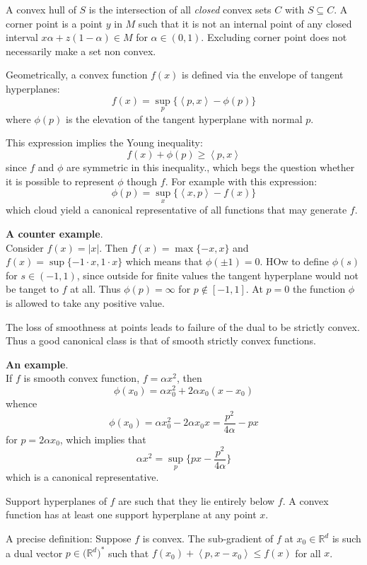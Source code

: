 \documentclass[a4paper]{article}
\newcommand{\brkt}[1]{{\left\langle #1 \right\rangle}}
\newcommand{\Real}{\mathbb{R}}
\begin{document}
A convex hull of $S$ is the intersection of all \emph{closed} convex sets $C$ with $S\subseteq C$. A corner point is a point $y$ in $M$ such that it is not an internal point of any closed interval $x\alpha + z(1-\alpha)\in M$ for $\alpha\in(0,1)$. Excluding corner point does not necessarily make a set non convex.

Geometrically, a convex function $f(x)$ is defined via the envelope of tangent hyperplanes:
\[f(x) = \sup_p \big\{ \brkt{p,x} - \phi(p) \big\}\]
where $\phi(p)$ is the elevation of the tangent hyperplane with normal $p$.

This expression implies the Young inequality:
\[f(x) + \phi(p) \geq \brkt{p,x}\]
since $f$ and $\phi$ are symmetric in this inequality., which begs the question whether it is possible to represent $\phi$ though $f$.
For example with this expression:
\[\phi(p) = \sup_x \big\{\brkt{x,p}-f(x)\big\}\]
which cloud yield a canonical representative of all functions that may generate $f$.

\textbf{A counter example}.\hfill \\
Consider $f(x) = \lvert x \rvert$. Then $f(x) = \max\{-x,x\}$ and $f(x) = \sup\{-1\cdot x, 1\cdot x\}$
which means that $\phi(\pm1)=0$. HOw to define $\phi(s)$ for $s\in (-1,1)$, since outside for finite values the tangent hyperplane would not be tanget to $f$ at all. Thus $\phi(p)=\infty$ for $p\notin [-1,1]$. At $p=0$ the function $\phi$ is allowed to take any positive value.

The loss of smoothness at points leads to failure of the dual to be strictly convex.
Thus a good canonical class is that of smooth strictly convex functions.

\textbf{An example}.\hfill \\
If $f$ is smooth convex function, $f=\alpha x^2$, then
\[\phi(x_0) = \alpha x_0^2 + 2\alpha x_0 (x-x_0)\]
whence 
\[\phi(x_0) = \alpha x_0^2 - 2\alpha x_0 x = \frac{p^2}{4 \alpha} - p x\]
for $p = 2\alpha x_0$, which implies that
\[\alpha x^2 = \sup_{p} \big\{ px - \frac{p^2}{4\alpha}\big\}\]
which is a canonical representative.

Support hyperplanes of $f$ are such that they lie entirely below $f$.
A convex function has at least one support hyperplane at any point $x$.

A precise definition:
Suppose $f$ is convex. The sub-gradient of $f$ at $x_0\in \Real^d$ is such a dual vector
$p\in\big(\Real^d)^*$ such that $f(x_0)+\brkt{p, x-x_0}\leq f(x)$ for all $x$.
\end{document}
